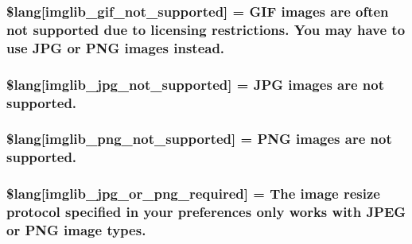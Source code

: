 \subsubsection[{\$lang}]{\setlength{\rightskip}{0pt plus 5cm}\$lang\mbox{[}\textquotesingle{}imglib\+\_\+gif\+\_\+not\+\_\+supported\textquotesingle{}\mbox{]} = \textquotesingle{}G\+I\+F images are often not supported due to licensing restrictions. You may have to use J\+P\+G or P\+N\+G images instead.\textquotesingle{}}\label{imglib__lang_8php_a235a59a6660145fc136b3933b5b10675}
\hypertarget{imglib__lang_8php_a4acdc927c172bab1370b2897c667c552}{}
\subsubsection[{\$lang}]{\setlength{\rightskip}{0pt plus 5cm}\$lang\mbox{[}\textquotesingle{}imglib\+\_\+jpg\+\_\+not\+\_\+supported\textquotesingle{}\mbox{]} = \textquotesingle{}J\+P\+G images are not supported.\textquotesingle{}}\label{imglib__lang_8php_a4acdc927c172bab1370b2897c667c552}
\hypertarget{imglib__lang_8php_a0b7ea2e2fbd03eb72fe9d969adb643dd}{}
\subsubsection[{\$lang}]{\setlength{\rightskip}{0pt plus 5cm}\$lang\mbox{[}\textquotesingle{}imglib\+\_\+png\+\_\+not\+\_\+supported\textquotesingle{}\mbox{]} = \textquotesingle{}P\+N\+G images are not supported.\textquotesingle{}}\label{imglib__lang_8php_a0b7ea2e2fbd03eb72fe9d969adb643dd}
\hypertarget{imglib__lang_8php_a2878e2b878871cd8010970f865d70e71}{}
\subsubsection[{\$lang}]{\setlength{\rightskip}{0pt plus 5cm}\$lang\mbox{[}\textquotesingle{}imglib\+\_\+jpg\+\_\+or\+\_\+png\+\_\+required\textquotesingle{}\mbox{]} = \textquotesingle{}The image resize protocol specified in your preferences only works with J\+P\+E\+G or P\+N\+G image types.\textquotesingle{}}\label{imglib__lang_8php_a2878e2b878871cd8010970f865d70e71}
\hypertarget{imglib__lang_8php_a012b6a0d2b3a8ef934e8783d2fbd6535}{}
